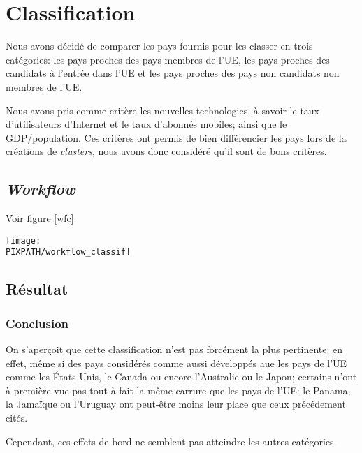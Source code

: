 \vfil
\pagebreak
\section{Classification}

Nous avons décidé de comparer les pays fournis pour
les classer en trois catégories: les pays proches des pays
membres de l'UE, les pays proches des candidats à l'entrée
dans l'UE et les pays proches des pays non candidats non
membres de l'UE.

Nous avons pris comme critère les nouvelles technologies, à savoir
le taux d'utilisateurs d'Internet et le taux d'abonnés mobiles; ainsi
que le GDP/population.
Ces critères ont permis de bien différencier les pays lors de la
créations de {\sl clusters}, nous avons donc considéré qu'il
sont de bons critères.

\subsection{{\sl Workflow}}
Voir figure \ref{wfc}

\begin{sidewaysfigure}[!h]
\begin{center}
    \caption{{\sl Workflow} classification}
    \texttt{[image: \\PIXPATH/workflow\_classif]}
\label{wfc}
\end{center}
\end{sidewaysfigure}


\subsection{Résultat}



\subsubsection{Conclusion}

On s'aperçoit que cette classification n'est pas forcément
la plus pertinente: en effet, même si des pays considérés comme
aussi développés aue les pays de l'UE comme les États-Unis, le Canada
ou encore l'Australie ou le Japon; certains n'ont à première vue pas
tout à fait la même carrure que les pays de l'UE: le Panama, la Jamaïque
ou l'Uruguay ont peut-être moins leur place que ceux précédement cités. 

Cependant, ces effets de bord ne semblent pas atteindre les autres
catégories.
